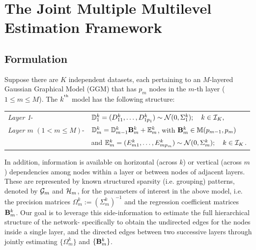 \section{The Joint Multiple Multilevel Estimation Framework}
\label{sec:sec2}

\subsection{Formulation}
{\colb Suppose there are $K$ independent datasets, each pertaining to an $M$-layered Gaussian Graphical Model (GGM) that has $p_m$ nodes in the $m$-th layer ($1 \leq m \leq M$). The $k^{\operatorname*{^{\text{th}}}}$ model has the following structure:}

\vspace{1em}
\begin{tabular}{ll}
{\it Layer 1}- &
%
${\mathbb{D}}_1^k = (D_{1 1}^k, \ldots, D^k_{1 p_1}) \sim
{\cal{N}} (0, \Sigma_1^k); \quad k \in {\cal{I}}_K,$\\
{\it Layer $m$} $(1< m \leq M)$-  &
%
$ {\mathbb{D}}_m^k = {\mathbb{D}}_{m-1}^k {\mathbf{B}}_m^k + {\mathbb{E}}_m^k$, with ${\mathbf{B}}_m^k \in {\mathbb{M}}(p_{m-1}, p_m) $\\
& and ${\mathbb{E}}_m^k = (E_{m 1}^k, \ldots, E^k_{m p_m}) \sim
{\cal{N}} (0, \Sigma_m^k); \quad k \in {\cal{I}}_K $.\\
\end{tabular}
\vspace{1em}

{\colb \noindent In addition, information is available on horizontal (across $k$) or vertical (across $m$) dependencies among nodes within a layer or between nodes of adjacent layers.} These are represented by known structured sparsity (i.e. grouping) patterns, denoted by ${\cal{G}}_m$ and ${\cal{H}}_m$, for the parameters of interest in the above model, i.e. the precision matrices $\Omega_m^k := (\Sigma_m^k)^{-1}$ and the regression coefficient matrices ${\mathbf{B}}_m^k$. Our goal is to leverage this side-information to estimate the full hierarchical structure of the network- specifically to obtain the undirected edges for the nodes inside a single layer, and the directed edges between two successive layers through jointly estimating $\{ \Omega_m^k \}$ and $\{ {\mathbf{B}}_m^k \}$.

